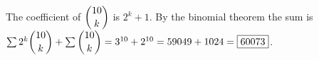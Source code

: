 The coefficient of $\dbinom{10}k$ is $2^k+1$. By the binomial theorem the sum is $\sum2^k\dbinom{10}k+\sum\dbinom{10}k=3^{10}+2^{10}=59049+1024=\boxed{60073}$.
